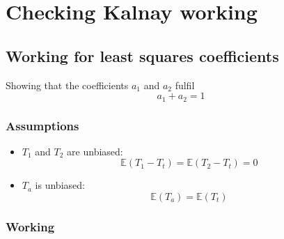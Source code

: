 \chapter{Checking Kalnay working}
\label{app:kalnay_working}

\section{Working for least squares coefficients}
\label{sec:kalnay_working:least_squares}

Showing that the coefficients $a_1$ and $a_2$ fulfil
\begin{equation}
a_1 + a_2 = 1
\end{equation}

\subsection{Assumptions}
\label{sub:least_squares:assumptions}

\begin{itemize}
    \item $T_1$ and $T_2$ are unbiased:
    \begin{equation}
        \mathbb{E}(T_1 - T_t) = \mathbb{E}(T_2 - T_t) = 0
    \end{equation}
    \item $T_a$ is unbiased:
    \begin{equation}
        \mathbb{E}(T_a) = \mathbb{E}(T_t)
    \end{equation}
\end{itemize}

\subsection{Working}
\label{sub:least_squares:working}


